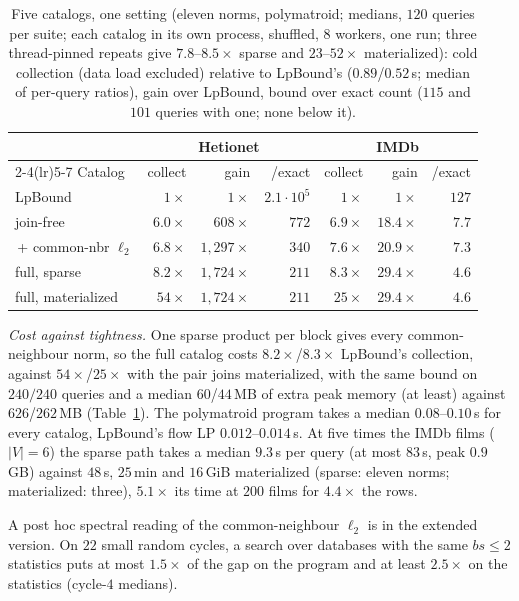 \documentclass[sigconf, nonacm, acmthm=false]{acmart}
\begin{document}
\begin{table}[t]
\centering
\caption{Five catalogs, one setting (eleven norms, polymatroid; medians,
$120$ queries per suite; each catalog in its own process, shuffled, $8$
workers, one run; three thread-pinned repeats give $7.8$--$8.5\times$
sparse and $23$--$52\times$ materialized): cold collection (data load excluded) relative to LpBound's
($0.89$/$0.52$\,s; median of per-query ratios), gain over LpBound, bound over exact count ($115$ and
$101$ queries with one; none below it).}
\label{tab:cost}
\small\setlength{\tabcolsep}{3pt}
\begin{tabular}{@{}lrrrrrr@{}}
\toprule
 & \multicolumn{3}{c}{Hetionet} & \multicolumn{3}{c}{IMDb} \\
\cmidrule(lr){2-4}\cmidrule(lr){5-7}
Catalog & collect & gain & /exact & collect & gain & /exact \\
\midrule
LpBound & $1\times$ & $1\times$ & $2.1{\cdot}10^{5}$ & $1\times$ & $1\times$ & $127$ \\
join-free & $6.0\times$ & $608\times$ & $772$ & $6.9\times$ & $18.4\times$ & $7.7$ \\
\,+ common-nbr $\ell_2$ & $6.8\times$ & $1{,}297\times$ & $340$ & $7.6\times$ & $20.9\times$ & $7.3$ \\
full, sparse &  $8.2\times$ & $1{,}724\times$ & $211$ & $8.3\times$ & $29.4\times$ & $4.6$ \\
full, materialized &  $54\times$ & $1{,}724\times$ & $211$ & $25\times$ & $29.4\times$ & $4.6$ \\
\bottomrule
\end{tabular}
\end{table}

\emph{Cost against tightness.} One sparse product per block gives every
common-neighbour norm, so the full catalog costs $8.2\times$/$8.3\times$
LpBound's collection, against $54\times$/$25\times$ with the pair joins
materialized, with the same bound on $240/240$ queries and a median
$60$/$44$\,MB of extra peak memory (at least) against $626$/$262$\,MB
(Table~\ref{tab:cost}). The polymatroid program takes a median
$0.08$--$0.10$\,s for every catalog, LpBound's flow LP $0.012$--$0.014$\,s.
At five times the IMDb films ($|V|{=}6$) the sparse path takes a median $9.3$\,s per query (at most $83$\,s, peak $0.9$\,GB) against $48$\,s, $25$\,min and $16$\,GiB materialized (sparse: eleven norms; materialized: three), $5.1\times$ its time at $200$ films for $4.4\times$ the rows.

A post hoc spectral reading of the common-neighbour $\ell_2$ is in the extended version. On $22$ small random cycles, a search over databases with the same
$bs{\le}2$ statistics puts at most $1.5\times$ of the gap on the program and
at least $2.5\times$ on the statistics (cycle-$4$ medians).
\end{document}
